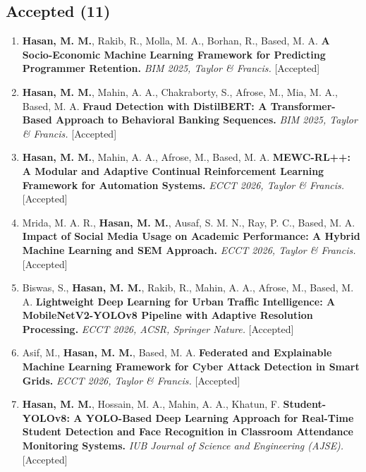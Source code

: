\documentclass[a4paper,11pt]{article}
\begin{document}
\subsection*{\normalsize Accepted \textnormal{(11)}}
\begin{enumerate}[leftmargin=1.5em, itemsep=6pt, topsep=0pt]

\item \textbf{Hasan, M. M.}, Rakib, R., Molla, M. A., Borhan, R., Based, M. A.
\textbf{A Socio-Economic Machine Learning Framework for Predicting Programmer Retention.}
\textit{BIM 2025, Taylor \& Francis.} \textcolor{teamgreen}{[Accepted]}

\item \textbf{Hasan, M. M.}, Mahin, A. A., Chakraborty, S., Afrose, M., Mia, M. A., Based, M. A.
\textbf{Fraud Detection with DistilBERT: A Transformer-Based Approach to Behavioral Banking Sequences.}
\textit{BIM 2025, Taylor \& Francis.} \textcolor{teamgreen}{[Accepted]}

\item \textbf{Hasan, M. M.}, Mahin, A. A., Afrose, M., Based, M. A.
\textbf{MEWC-RL++: A Modular and Adaptive Continual Reinforcement Learning Framework for Automation Systems.}
\textit{ECCT 2026, Taylor \& Francis.} \textcolor{teamgreen}{[Accepted]}

\item Mrida, M. A. R., \textbf{Hasan, M. M.}, Ausaf, S. M. N., Ray, P. C., Based, M. A.
\textbf{Impact of Social Media Usage on Academic Performance: A Hybrid Machine Learning and SEM Approach.}
\textit{ECCT 2026, Taylor \& Francis.} \textcolor{teamgreen}{[Accepted]}

\item Biswas, S., \textbf{Hasan, M. M.}, Rakib, R., Mahin, A. A., Afrose, M., Based, M. A.
\textbf{Lightweight Deep Learning for Urban Traffic Intelligence: A MobileNetV2-YOLOv8 Pipeline with Adaptive Resolution Processing.}
\textit{ECCT 2026, ACSR, Springer Nature.} \textcolor{teamgreen}{[Accepted]}

\item Asif, M., \textbf{Hasan, M. M.}, Based, M. A.
\textbf{Federated and Explainable Machine Learning Framework for Cyber Attack Detection in Smart Grids.}
\textit{ECCT 2026, Taylor \& Francis.} \textcolor{teamgreen}{[Accepted]}

\item \textbf{Hasan, M. M.}, Hossain, M. A., Mahin, A. A., Khatun, F.
\textbf{Student-YOLOv8: A YOLO-Based Deep Learning Approach for Real-Time Student Detection and Face Recognition in Classroom Attendance Monitoring Systems.}
\textit{IUB Journal of Science and Engineering (AJSE).} \textcolor{teamgreen}{[Accepted]}


\end{enumerate}
\end{document}
